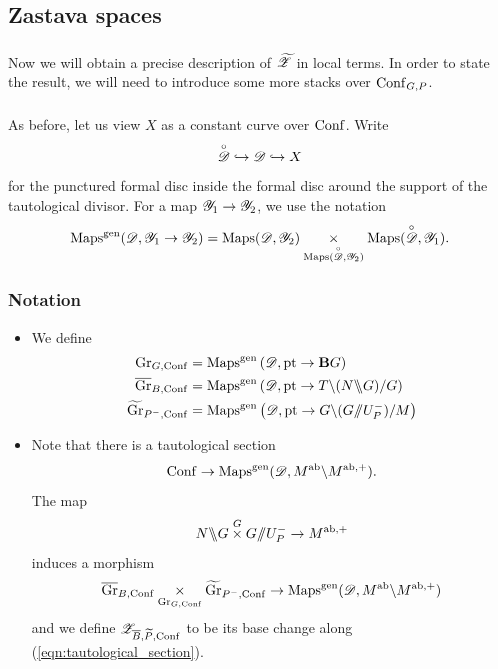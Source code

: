 \subsection{Zastava spaces}
\label{subsection:Zastava_spaces}

\subsubsection{} Now we will obtain a precise description of ${\widetilde{\mathscr{Z}}}$ in local terms. In order to state the result, we will need to introduce some more stacks over $\mathrm{Conf}_{G,P}$. 

\subsubsection{} As before, let us view $X$ as a constant curve over $\mathrm{Conf}$. Write
    \[\overset{\circ}{\mathscr{D}} \hookrightarrow \mathscr{D} \hookrightarrow X\]
for the punctured formal disc inside the formal disc around the support of the tautological divisor. For a map $\mathscr{Y}_1 \to \mathscr{Y}_2$, we use the notation
    \[
    \mathrm{Maps}^{\mathrm{gen}}(\mathscr{D}, \mathscr{Y}_1 \to \mathscr{Y}_2) = \mathrm{Maps}(\mathscr{D}, \mathscr{Y}_2) \underset{\mathrm{Maps}(\overset{\circ}{\mathscr{D}}, \mathscr{Y}_2)}{\times} \mathrm{Maps}(\overset{\circ}{\mathscr{D}}, \mathscr{Y}_1).
    \]

\subsubsection{Notation}
\begin{itemize}
    \item We define
        \begin{align*}
            \mathrm{Gr}_{G,\mathrm{Conf}} &= \mathrm{Maps}^{\mathrm{gen}} \left( \mathscr{D}, \mathrm{pt} \to \mathbf{B} G \right)   \\
            \overline{\mathrm{Gr}}_{B,\mathrm{Conf}} &= \mathrm{Maps}^{\mathrm{gen}} \left( \mathscr{D}, \mathrm{pt} \to T \backslash (N \backslash\!\!\backslash G) / G \right)   \\
            \widetilde{\mathrm{Gr}}_{P^-,\mathrm{Conf}} &= \mathrm{Maps}^{\mathrm{gen}} \left( \mathscr{D}, \mathrm{pt} \to G \backslash (G / \!\! / U_P^- ) / M \right)
        \end{align*}
    \item Note that there is a tautological section
        \begin{equation}
            \label{eqn:tautological_section}
            \mathrm{Conf} \to \mathrm{Maps}^{\mathrm{gen}}(\mathscr{D}, M^{\mathrm{ab}} \backslash M^{\mathrm{ab}, +}).
        \end{equation}
    The map
        \[N \backslash\!\!\backslash G \overset{G}{\times} G / \!\! / U_P^- \to M^{\mathrm{ab}, +}\]
    induces a morphism
        \[\overline{\mathrm{Gr}}_{B,\mathrm{Conf}} \underset{\mathrm{Gr}_{G,\mathrm{Conf}}}{\times} \widetilde{\mathrm{Gr}}_{P^-, \mathrm{Conf}} \to \mathrm{Maps}^{\mathrm{gen}}(\mathscr{D}, M^{\mathrm{ab}} \backslash M^{\mathrm{ab}, +})\]
    and we define $\mathscr{Z}_{\overline{B}, \widetilde{P}, \mathrm{Conf}}$ to be its base change along (\ref{eqn:tautological_section}).
\end{itemize}
